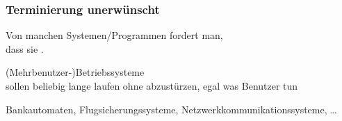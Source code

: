     \begin{frame}
      \frametitle{Terminierung unerwünscht}

      \begin{block}{}
        Von manchen Systemen/Programmen fordert man,\\
        dass sie .
      \end{block}

      \par\bigskip
      \begin{exampleblock}{}
        \par\vspace*{-6pt}
        \begin{Itemize}
          \item
            (Mehrbenutzer-)Betriebssysteme\\
            {\small sollen beliebig lange laufen ohne abzustürzen, egal was Benutzer tun}
          \item
            Bankautomaten, Flugsicherungssysteme, Netzwerkkommunikationssysteme, \dots
        \end{Itemize}
      \end{exampleblock}

      \par\bigskip
    \end{frame}

